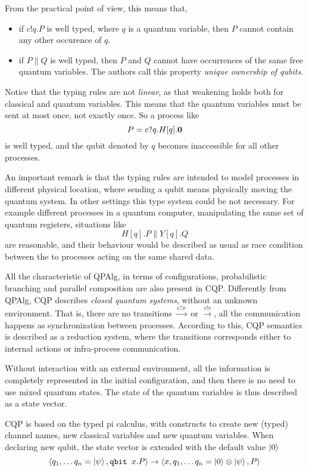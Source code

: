 From the practical point of view, this means that, \begin{itemize} 
\item if $c!q.P$ is well typed, where $q$ is a quantum variable, then $P$ cannot contain any other occurence of $q$.
\item if $P \parallel Q$ is well typed, then $P$ and $Q$ cannot have occurrences of the same free quantum variables. The authors call this property \textit{unique ownership of qubits}.
\end{itemize}

Notice that the typing rules are not \textit{linear}, as that weakening holds both for classical and quantum variables. This means that the quantum variables must be sent at most once, not exactly once. So a process like 
\[P = c?q.H[q].\mathbf{0}\]
is well typed, and the qubit denoted by $q$ becomes inaccessible for all other processes.

An important remark is that the typing rules are intended to model processes in different physical location, where sending a qubit means physically moving the quantum system. In other settings this type system could be not necessary. For example different processes in a quantum computer, manipulating the same set of quantum registers, situations like 
\[ H[q].P \parallel Y[q].Q\]
are reasonable, and their behaviour would be described as usual as race condition between the to processes acting on the same shared data.

All the characteristic of QPAlg, in terms of configurations, probabilistic branching and parallel composition are also present in CQP. Differently from QPAlg, CQP  describes \textit{closed quantum systems}, without an unknown environment. That is, there are no transitions $\xrightarrow{c?x}$ or $\xrightarrow{c!v}$, all the communication happens as synchronization between processes. According to this, CQP semantics is described as a reduction system, where the transitions corresponds either to internal actions or infra-process communication.  


Without interaction with an external environment, all the information is completely represented in the initial configuration, and then there is no need to use mixed quantum states. The state of the quantum variables is thus described as a state vector.


CQP is based on the typed pi calculus, with constructs to create new (typed) channel names, new classical variables and new quantum variables. When declaring  new qubit, the state vector is extended with the default value $\ket{0}$
\[ \langle q_1, \ldots q_n = \ket{\psi}, \texttt{qbit }x.P\rangle \rightarrow \langle x,q_1, \ldots q_n = \ket{0}\otimes\ket{\psi} , P\rangle\]

